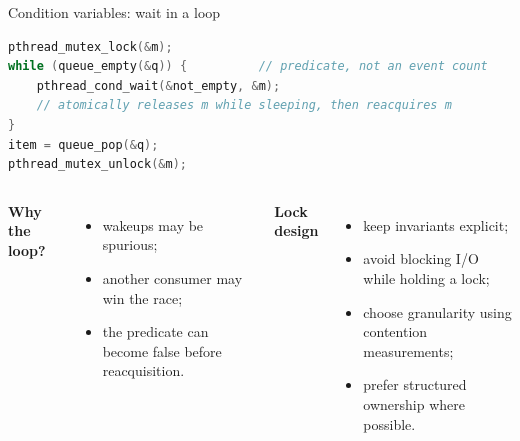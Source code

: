 \documentclass[aspectratio=169,11pt]{beamer}
\begin{document}
\begin{frame}[fragile]{Condition variables: wait in a loop}
\begin{lstlisting}[language=C]
pthread_mutex_lock(&m);
while (queue_empty(&q)) {          // predicate, not an event count
    pthread_cond_wait(&not_empty, &m);
    // atomically releases m while sleeping, then reacquires m
}
item = queue_pop(&q);
pthread_mutex_unlock(&m);
\end{lstlisting}
  \begin{columns}[T,onlytextwidth]
      \textbf{Why the loop?}
      \begin{itemize}
        \item wakeups may be spurious;
        \item another consumer may win the race;
        \item the predicate can become false before reacquisition.
      \end{itemize}
      \textbf{Lock design}
      \begin{itemize}
        \item keep invariants explicit;
        \item avoid blocking I/O while holding a lock;
        \item choose granularity using contention measurements;
        \item prefer structured ownership where possible.
      \end{itemize}
  \end{columns}
\end{frame}
\end{document}
